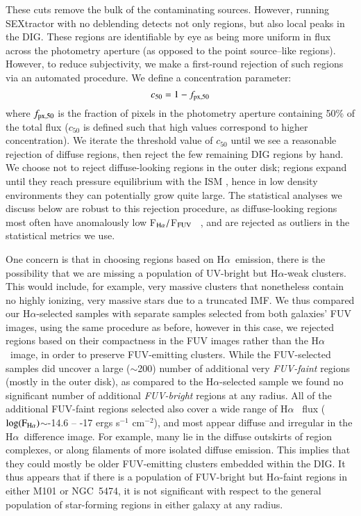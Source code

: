 \documentclass[iop]{emulateapj}
\newcommand{\ha}{H$\alpha$}
\newcommand{\hafuv}{F$_{\rm H\alpha}/$F$_{\rm FUV}$}
\newcommand{\lgflux}{$\log(\rm F_{\rm H\alpha})$}
\newcommand{\fluxunit}{ergs s$^{-1}$ cm$^{-2}$}
\begin{document}
These cuts remove the bulk of the contaminating sources.  However,
running SEXtractor with no deblending detects not only 
regions, but also local peaks in the DIG.  These regions are
identifiable by eye as being more uniform in flux across the
photometry aperture (as opposed to the point source--like 
regions).  However, to reduce subjectivity, we make a first-round
rejection of such regions via an automated procedure.  We define a
concentration parameter:
\begin{equation}
  c_{50} = 1-f_{{\rm px},50}
\end{equation}
where $f_{{\rm px},50}$ is the fraction of pixels in the photometry aperture
containing 50\% of the total flux ($c_{50}$ is defined such that high
values correspond to higher concentration).  We iterate the threshold
value of $c_{50}$ until we see a reasonable rejection of diffuse
regions, then reject the few remaining DIG regions by hand.  We choose
not to reject diffuse-looking regions in the outer disk; 
regions expand until they reach pressure equilibrium with the ISM
\citep{dyson80, garcia96}, hence in low density environments
they can potentially grow quite large.  The statistical analyses we
discuss below are robust to this rejection procedure, as
diffuse-looking regions most often have anomalously low \hafuv
\ \citep[which further implies they are mostly DIG;][]{hoopes01}, and
are rejected as outliers in the statistical metrics we use.

One concern is that in choosing regions based on \ha \ emission, there
is the possibility that we are missing a population of UV-bright but
\ha-weak clusters.  This would include, for example, very massive
clusters that nonetheless contain no highly ionizing, very massive
stars due to a truncated IMF.  We thus compared our \ha-selected
samples with separate samples selected from both galaxies' FUV images,
using the same procedure as before, however in this case, we rejected
regions based on their compactness in the FUV images rather than the
\ha \ image, in order to preserve FUV-emitting clusters.  While the
FUV-selected samples did uncover a large ($\sim$200) number of
additional very \emph{FUV-faint} regions (mostly in the outer disk),
as compared to the \ha-selected sample we found no significant number
of additional \emph{FUV-bright} regions at any radius.  All of the
additional FUV-faint regions selected also cover a wide range of \ha
\ flux (\lgflux $\sim$-14.6 -- -17 \fluxunit), and most appear diffuse
and irregular in the \ha \ difference image.  For example, many lie in
the diffuse outskirts of  region complexes, or along
filaments of more isolated diffuse emission.  This implies that they
could mostly be older FUV-emitting clusters embedded within the DIG.
It thus appears that if there is a population of FUV-bright but
\ha-faint regions in either M101 or NGC~5474, it is not significant
with respect to the general population of star-forming regions in
either galaxy at any radius.
\end{document}
